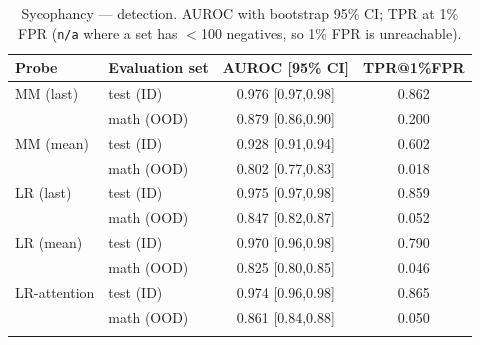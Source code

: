 \begin{table}[H]
\centering
\begin{minipage}[t]{0.49\textwidth}
\centering
\centering
\scriptsize
\setlength{\tabcolsep}{3pt}
\begin{tabular}{llcc}
\toprule
Probe & Evaluation set & AUROC [95\% CI] & TPR@1\%FPR \\
\midrule
MM (last) & test (ID) & 0.976 [0.97,0.98] & 0.862 \\
 & math (OOD) & 0.879 [0.86,0.90] & 0.200 \\
\addlinespace[2pt]
MM (mean) & test (ID) & 0.928 [0.91,0.94] & 0.602 \\
 & math (OOD) & 0.802 [0.77,0.83] & 0.018 \\
\addlinespace[2pt]
LR (last) & test (ID) & 0.975 [0.97,0.98] & 0.859 \\
 & math (OOD) & 0.847 [0.82,0.87] & 0.052 \\
\addlinespace[2pt]
LR (mean) & test (ID) & 0.970 [0.96,0.98] & 0.790 \\
 & math (OOD) & 0.825 [0.80,0.85] & 0.046 \\
\addlinespace[2pt]
LR-attention & test (ID) & 0.974 [0.96,0.98] & 0.865 \\
 & math (OOD) & 0.861 [0.84,0.88] & 0.050 \\
\addlinespace[2pt]
\bottomrule
\end{tabular}
\caption{Sycophancy --- detection. AUROC with bootstrap 95\% CI; TPR at 1\% FPR (\texttt{n/a} where a set has $<$100 negatives, so 1\% FPR is unreachable).}
\label{tab:app-det-sycophancy}
\end{minipage}
\end{table}
